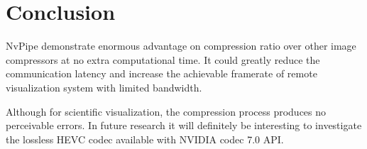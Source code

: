 \documentclass{vgtc}                          %
\begin{document}
\section{Conclusion}

NvPipe demonstrate enormous advantage on compression ratio over other image compressors at no extra computational time. It could greatly reduce the communication latency and increase the achievable framerate of remote visualization system with limited bandwidth.

Although for scientific visualization, the compression process produces no perceivable errors. In future research it will definitely be interesting to investigate the lossless HEVC codec available with NVIDIA codec 7.0 API.



\nocite{*}

\end{document}

